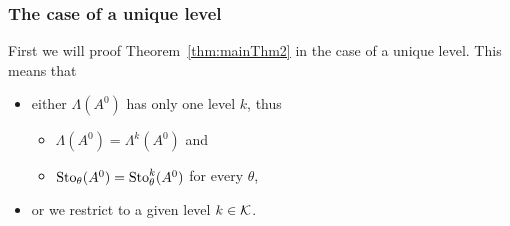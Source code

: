 \subsubsection{The case of a unique level}
First we will proof Theorem~\ref{thm:mainThm2} in the case of a unique level.
This means that
\begin{itemize}
  \item either $\Lambda(A^0)$ has only one level $k$, thus
    \begin{itemize}
      \item $\Lambda(A^0)=\Lambda^k(A^0)$ and
      \item $\operatorname{Sto}_\theta(A^0)=\operatorname{Sto}_\theta^k(A^0)$ for every $\theta$,
    \end{itemize}
  \item or we restrict to a given level $k\in\mathcal{K}$.
\end{itemize}
\begin{comment}
  \begin{lem}\label{lem:extendsSoFar}
    Every $k$-germ $\phi_\alpha\in\Lambda_\alpha^k(A^0)$ can be uniquely
    extended to the corresponding arc $U_\alpha^k$ in $\cU^k$.
    \begin{s-cor}
      For every $\alpha$ can every germ at $\phi_\alpha\in\Lambda_\alpha(A^0)$,
      with the levels $\cK(\phi_\alpha)$, be extended to the arc
      $\underset{U_\alpha}{%
        \underset{\text{\rotatebox[origin=c]{90}{$\subset$}}}{%
          U_\alpha^{\max\cK(\phi_\alpha)}}}\in\cU^{\max\cK(\phi_\alpha)}$.
    \end{s-cor}
  \end{lem}
  Since the sheaf $\hat\SSto(A^0)$ is locally constant with discontinuities at
  the Stokes directions.
\end{comment}
